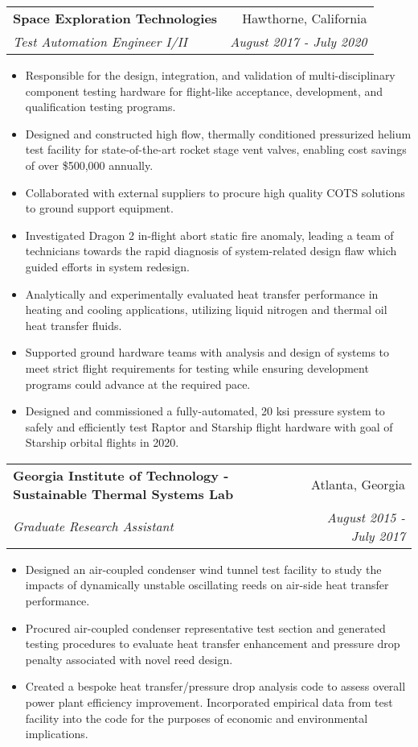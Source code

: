 \documentclass[letterpaper,11pt]{article}
\makeatletter
\newcommand{\resumeSubheading}[4]{
  \vspace{-1pt}\item
    \begin{tabular*}{0.97\textwidth}[t]{l@{\extracolsep{\fill}}r}
      \textbf{#1} & #2 \\
      \textit{\small#3} & \textit{\small #4} \\
    \end{tabular*}\vspace{-5pt}
}
\newcommand{\resumeItemListStart}{\begin{itemize}}
\newcommand{\resumeItemListEnd}{\end{itemize}\vspace{-5pt}}
\makeatother
\begin{document}
    \resumeSubheading
      {Space Exploration Technologies}{Hawthorne, California}
      {Test Automation Engineer I/II}{August 2017 - July 2020}
      \resumeItemListStart
        	\item{Responsible for the design, integration, and validation of multi-disciplinary component testing hardware for flight-like acceptance, development, and qualification testing programs.}
	\item{Designed and constructed high flow, thermally conditioned pressurized helium test facility for state-of-the-art rocket stage vent valves, enabling cost savings of over \$500,000 annually.}
	\item{Collaborated with external suppliers to procure high quality COTS solutions to ground support equipment.}
	\item{Investigated Dragon 2 in-flight abort static fire anomaly, leading a team of technicians towards the rapid diagnosis of system-related design flaw which guided efforts in system redesign.}
	\item{Analytically and experimentally evaluated heat transfer performance in heating and cooling applications, utilizing liquid nitrogen and thermal oil heat transfer fluids.}
	\item{Supported ground hardware teams with analysis and design of systems to meet strict flight requirements for testing while ensuring development programs could advance at the required pace.}
	\item{Designed and commissioned a fully-automated, 20 ksi pressure system to safely and efficiently test Raptor and Starship flight hardware with goal of Starship orbital flights in 2020.}
      \resumeItemListEnd

    \resumeSubheading
      {Georgia Institute of Technology - Sustainable Thermal Systems Lab}{Atlanta, Georgia}
      {Graduate Research Assistant}{August 2015 - July 2017}
      \resumeItemListStart
        \item{Designed an air-coupled condenser wind tunnel test facility to study the impacts of dynamically unstable oscillating reeds on air-side heat transfer performance.}
        \item{Procured air-coupled condenser representative test section and generated testing procedures to evaluate heat transfer enhancement and pressure drop penalty associated with novel reed design.}
        \item{Created a bespoke heat transfer/pressure drop analysis code to assess overall power plant efficiency improvement. Incorporated empirical data from test facility into the code for the purposes of economic and environmental implications.}
      \resumeItemListEnd
\end{document}
